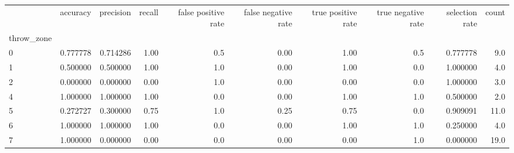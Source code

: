 \begin{tabular}{lrrrrrrrrr}
\toprule
{} &  accuracy &  precision &  recall &  false positive rate &  false negative rate &  true positive rate &  true negative rate &  selection rate &  count \\
throw\_zone &           &            &         &                      &                      &                     &                     &                 &        \\
\midrule
0          &  0.777778 &   0.714286 &    1.00 &                  0.5 &                 0.00 &                1.00 &                 0.5 &        0.777778 &    9.0 \\
1          &  0.500000 &   0.500000 &    1.00 &                  1.0 &                 0.00 &                1.00 &                 0.0 &        1.000000 &    4.0 \\
2          &  0.000000 &   0.000000 &    0.00 &                  1.0 &                 0.00 &                0.00 &                 0.0 &        1.000000 &    3.0 \\
4          &  1.000000 &   1.000000 &    1.00 &                  0.0 &                 0.00 &                1.00 &                 1.0 &        0.500000 &    2.0 \\
5          &  0.272727 &   0.300000 &    0.75 &                  1.0 &                 0.25 &                0.75 &                 0.0 &        0.909091 &   11.0 \\
6          &  1.000000 &   1.000000 &    1.00 &                  0.0 &                 0.00 &                1.00 &                 1.0 &        0.250000 &    4.0 \\
7          &  1.000000 &   0.000000 &    0.00 &                  0.0 &                 0.00 &                0.00 &                 1.0 &        0.000000 &   19.0 \\
\bottomrule
\end{tabular}
